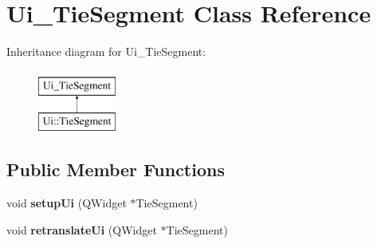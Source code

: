 \hypertarget{class_ui___tie_segment}{}\section{Ui\+\_\+\+Tie\+Segment Class Reference}
\label{class_ui___tie_segment}
Inheritance diagram for Ui\+\_\+\+Tie\+Segment\+:\begin{figure}[H]
\begin{center}
\leavevmode
\includegraphics[height=2.000000cm]{class_ui___tie_segment}
\end{center}
\end{figure}
\subsection*{Public Member Functions}
\begin{DoxyCompactItemize}
\item 
\mbox{\label{class_ui___tie_segment_a0c910c19e227b2ece7ea6a6a23a9491f}} 
void {\bfseries setup\+Ui} (Q\+Widget $\ast$Tie\+Segment)
\item 
\mbox{\label{class_ui___tie_segment_a2dec336d29a9b814388cd6485191fde9}} 
void {\bfseries retranslate\+Ui} (Q\+Widget $\ast$Tie\+Segment)
\end{DoxyCompactItemize}
